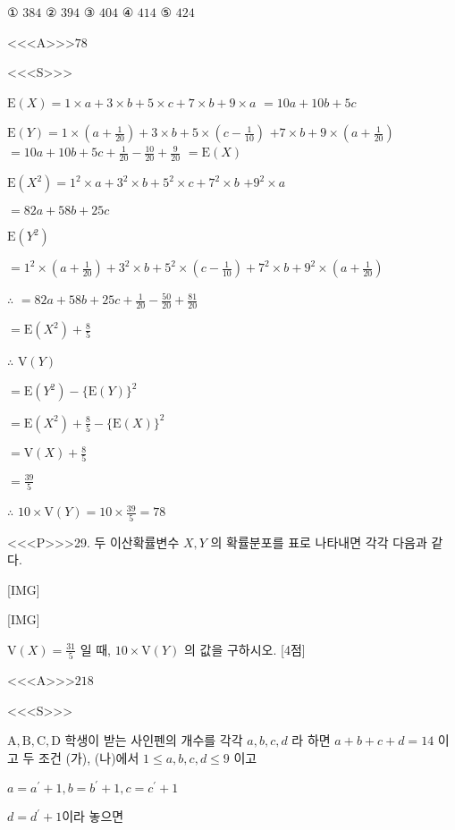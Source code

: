\documentclass{oblivoir}
\begin{document}
① $384$
② $394$
③ $404$
④ $414$
⑤ $424$


<<<A>>>$78$

<<<S>>>



$\mathrm{E}(X)=1 \times a+3 \times b+5 \times c+7 \times b+9 \times a$
$=10 a+10 b+5 c$

$\mathrm{E}(Y)=1 \times\left(a+\frac{1}{20}\right)+3 \times b+5 \times\left(c-\frac{1}{10}\right)$
$+7 \times b+9 \times\left(a+\frac{1}{20}\right)$
$=10 a+10 b+5 c+\frac{1}{20}-\frac{10}{20}+\frac{9}{20}$
$=\mathrm{E}(X)$

$\mathrm{E}\left(X^{2}\right)=1^{2} \times a+3^{2} \times b+5^{2} \times c+7^{2} \times b$
$+9^{2} \times a$

$=82 a+58 b+25 c$

$ \mathrm{E}\left(Y^{2}\right)$

$=1^{2} \times\left(a+\frac{1}{20}\right)+3^{2} \times b+5^{2} \times\left(c-\frac{1}{10}\right) +7^{2} \times b+9^{2} \times\left(a+\frac{1}{20}\right)$

$\therefore$ $=82 a+58 b+25 c+\frac{1}{20}-\frac{50}{20}+\frac{81}{20}$

$= \mathrm{E}\left(X^{2}\right)+\frac{8}{5}$

$\therefore$ $\mathrm{V}(Y)$

$=\mathrm{E}\left(Y^{2}\right)-\{\mathrm{E}(Y)\}^{2}$

$=\mathrm{E}\left(X^{2}\right)+\frac{8}{5}-\{\mathrm{E}(X)\}^{2}$

$=\mathrm{V}(X)+\frac{8}{5}$

$=\frac{39}{5}$

$\therefore$ $10 \times \mathrm{V}(Y)=10 \times \frac{39}{5}=78 $


<<<P>>>29. 두 이산확률변수 $X, Y$ 의 확률분포를 표로 나타내면 각각 다음과 같다.

[IMG]

[IMG]

$\mathrm{V}(X)=\frac{31}{5}$ 일 때, $10 \times \mathrm{V}(Y)$ 의 값을 구하시오. [4점]

<<<A>>>$218$

<<<S>>>



$\mathrm{A}, \mathrm{B}, \mathrm{C}, \mathrm{D}$ 학생이 받는 사인펜의 개수를 각각 $a, b, c, d$ 라 하면 $a+b+c+d=14$ 이고
두 조건 (가), (나)에서 $1 \leq a, b, c, d \leq 9$ 이고

$a=a^{\prime}+1, b=b^{\prime}+1, c=c^{\prime}+1$

$d=d^{\prime}+1$이라 놓으면
\end{document}
